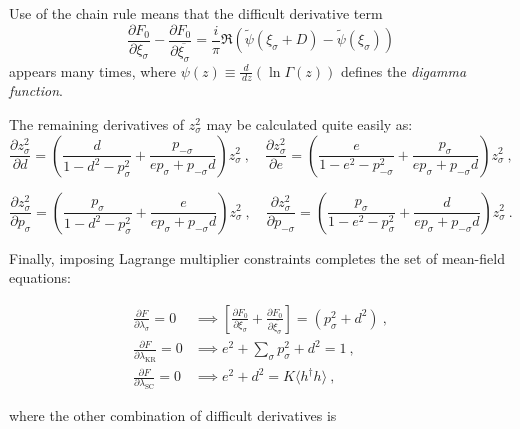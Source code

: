 \documentclass[12pt]{article}
\begin{document}
Use of the chain rule means that the difficult derivative term
\begin{equation}
\frac{\partial F_{0}}{\partial \xi_{\sigma}} - \frac{\partial F_{0}}{\partial \overline{\xi_{\sigma}}} = \frac{i}{\pi} \Re{( \widetilde{\psi}(\xi_{\sigma} + D) - \widetilde{\psi}(\xi_{\sigma}))}
\end{equation}
appears many times, where $ \psi(z) \equiv \frac{d}{\,dz}(\ln{\Gamma(z)}) $ defines the \textit{digamma function}.

The remaining derivatives of $ z^2_{\sigma} $ may be calculated quite easily as:
\begin{equation}
\frac{\partial z^2_{\sigma}}{\partial d} = \left( \frac{d}{1 - d^2 - p^2_{\sigma}} + \frac{p_{-\sigma}}{e p_{\sigma} + p_{- \sigma} d} \right) z^2_{\sigma} ~, \quad \frac{\partial z^2_{\sigma}}{\partial e} = \left( \frac{e}{1 - e^2 - p^2_{-\sigma}} + \frac{p_{\sigma}}{e p_{\sigma} + p_{- \sigma} d} \right) z^2_{\sigma} ~,
\end{equation}


\begin{equation}
\frac{\partial z^2_{\sigma}}{\partial p_{\sigma}} = \left( \frac{p_{\sigma}}{1 - d^2 - p^2_{\sigma}} + \frac{e}{e p_{\sigma} + p_{- \sigma} d} \right) z^2_{\sigma} ~, \quad \frac{\partial z^2_{\sigma}}{\partial p_{-\sigma}} = \left( \frac{p_{\sigma}}{1 - e^2 - p^2_{\sigma}} + \frac{d}{e p_{\sigma} + p_{- \sigma} d} \right) z^2_{\sigma} ~.
\end{equation}

Finally, imposing Lagrange multiplier constraints completes the set of mean-field equations:

\begin{align}
\frac{\partial F}{\partial \lambda_{\sigma}} = 0 &\implies \left[ \frac{\partial F_{0}}{\partial \xi_{\sigma}} + \frac{\partial F_{0}}{\partial \overline{\xi_{\sigma}}} \right] = (p^2_{\sigma} + d^2) ~ , \label{eq:MF_lambda_sigma} \\
\frac{\partial F}{\partial \lambda_{\text{KR}}} = 0 &\implies e^2 + \sum_{\sigma} p^2_{\sigma} + d^2 = 1 ~ , \label{eq:MF_lambda_KR} \\
\frac{\partial F}{\partial \lambda_{\text{SC}}} = 0 &\implies e^2 + d^2 = K \langle h^{\dagger} h \rangle ~ , \label{eq:MF_lambda_SC}
\end{align}

where the other combination of difficult derivatives is
\end{document}
